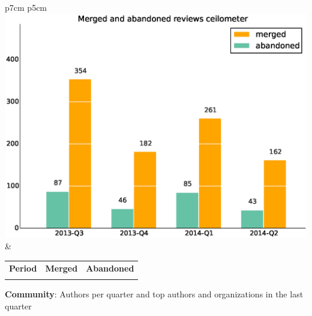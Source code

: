 \documentclass[a4wide,11pt]{report}
\begin{document}
\begin{tabular}{p{7cm} p{5cm}}
    \vspace{0pt} 
    \includegraphics[scale=.35]{figs/submitted_reviewsceilometer.eps}
    & 
    \vspace{0pt}
    \begin{tabular}{l|r|r|}%
    \bfseries Period & \bfseries Merged & \bfseries Abandoned %
    \csvreader[head to column names]{data/submitted_reviewsceilometer.csv}{}%
    {\\ & \merged & \abandoned}
    \end{tabular}
\end{tabular}


\textbf{Community}: Authors per quarter and top authors and organizations in the last quarter
\end{document}
